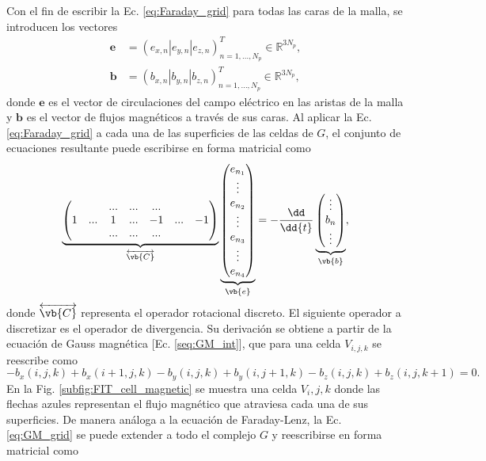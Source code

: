 Con el fin de escribir la Ec. \ref{eq:Faraday_grid} para todas las caras de la malla, se introducen los vectores
%
\begin{align}
	\mathbf{e}&=(e_{x,n}|e_{y,n}|e_{z,n})_{n=1,...,N_p}^T\in \mathbb{R}^{3N_p},\\
	\mathbf{b}&=(b_{x,n}|b_{y,n}|b_{z,n})_{n=1,...,N_p}^T\in \mathbb{R}^{3N_p},
\end{align}
%
donde $\mathbf{e}$ es el vector de circulaciones del campo eléctrico en las aristas de la malla y $\mathbf{b}$ es el vector de flujos magnéticos a través de sus caras.
Al aplicar la Ec. \ref{eq:Faraday_grid} a cada una de las superficies de las celdas de $G$, el conjunto de ecuaciones resultante puede escribirse en forma matricial como
%
\begin{equation}
	\underbrace{\begin{pmatrix}
			&  & ... & ... & ... & &\\
			1 & ... & 1 & ... & -1 & ... &-1\\
			&  & ... & ... & ... & &
	\end{pmatrix}}_{\overleftrightarrow{\vb{C}}}\underbrace{\begin{pmatrix}
			e_{n_1}\\
			\vdots\\
			e_{n_2}\\
			\vdots\\e_{n_3}\\
			\vdots\\
			e_{n_4}
	\end{pmatrix}}_{\vb{e}}=-\frac{\dd}{\dd{t}}\underbrace{\begin{pmatrix}
			\vdots\\
			b_{n}\\
			\vdots
	\end{pmatrix}}_{\vb{b}},
	\label{eq:rot_discreto}
\end{equation}
%
donde $\overleftrightarrow{\vb{C}}$ representa el operador rotacional discreto. El siguiente operador a discretizar es el operador de divergencia. Su derivación se obtiene a partir de la ecuación de Gauss magnética [Ec. \ref{seq:GM_int}], que para una celda $V_{i,j,k}$ se reescribe como 
%
\begin{equation}
	-b_x(i, j, k)+b_x(i+1, j, k)-b_y(i, j, k)+b_y(i, j+1, k)-b_z(i,j,k)+b_z(i,j,k+1)=0.
	\label{eq:GM_grid}
\end{equation}
% 
En la Fig. \ref{subfig:FIT_cell_magnetic} se muestra una celda $V_i,j,k$ donde las flechas azules representan el flujo magnético que atraviesa cada una de sus superficies. De manera análoga a la ecuación de Faraday-Lenz, la Ec. \ref{eq:GM_grid} se puede extender a todo el complejo $G$ y reescribirse en forma matricial como
